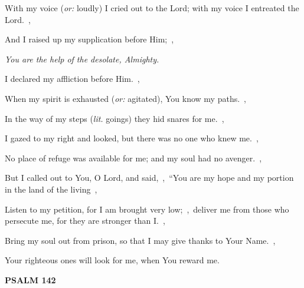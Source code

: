 \documentclass[12pt,twoside,a5paper]{article}
\newcommand{\psalm}[1]{\textbf{PSALM {#1}}\nopagebreak}
\newcommand{\qanona}[1]{{\liturgicalhint{Qanona.} \emph{#1}}}
\newcommand{\translationoption}[1]{\emph{or:} #1}
\newcommand{\translationliteral}[1]{\emph{lit.} #1}
\begin{document}
\begin{normalparskip}
  With my voice (\translationoption{loudly}) I cried out to the Lord; with my voice I entreated the Lord.~\sep

  And I raised up my supplication before Him;~\sep

  \qanona{You are the help of the desolate, Almighty.}

  I declared my affliction before Him.~\sep

  When my spirit is exhausted (\translationoption{agitated}), You know my paths.~\sep

  In the way of my steps (\translationliteral{goings}) they hid snares for me.~\sep

  I gazed to my right and looked, but there was no one who knew me.~\sep

  No place of refuge was available for me; and my soul had no avenger.~\sep

  But I called out to You, O Lord, and said,~\sep\ ``You are my hope and my portion in the land of the living~\sep

  Listen to my petition, for I am brought very low;~\sep\ deliver me from those who persecute me, for they are stronger than I.~\sep

  Bring my soul out from prison, so that I may give thanks to Your Name.~\sep

  Your righteous ones will look for me, when You reward me.
\end{normalparskip}

\psalm{142}
\end{document}

